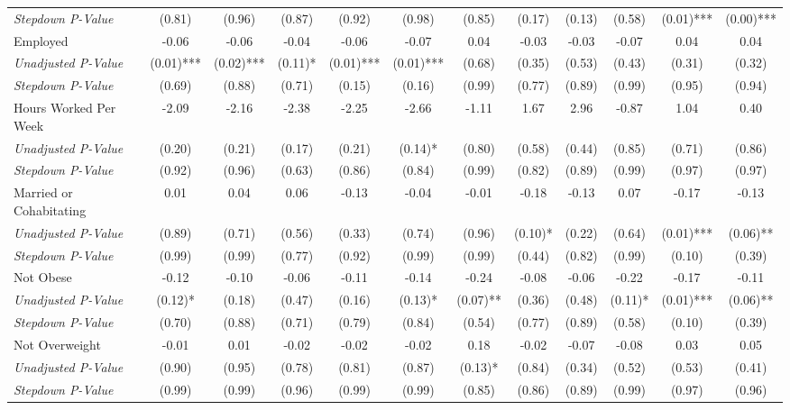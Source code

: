 \begin{tabular}{l c c c c c c c c c c c}
\quad \textit{Stepdown P-Value} & (0.81) & (0.96) & (0.87) & (0.92) & (0.98) & (0.85) & (0.17) & (0.13) & (0.58) & (0.01)*** & (0.00)*** \\
Employed & -0.06 & -0.06 & -0.04 & -0.06 & -0.07 & 0.04 & -0.03 & -0.03 & -0.07 & 0.04 & 0.04 \\
\quad \textit{Unadjusted P-Value} & (0.01)*** & (0.02)*** & (0.11)* & (0.01)*** & (0.01)*** & (0.68) & (0.35) & (0.53) & (0.43) & (0.31) & (0.32) \\
\quad \textit{Stepdown P-Value} & (0.69) & (0.88) & (0.71) & (0.15) & (0.16) & (0.99) & (0.77) & (0.89) & (0.99) & (0.95) & (0.94) \\
Hours Worked Per Week & -2.09 & -2.16 & -2.38 & -2.25 & -2.66 & -1.11 & 1.67 & 2.96 & -0.87 & 1.04 & 0.40 \\
\quad \textit{Unadjusted P-Value} & (0.20) & (0.21) & (0.17) & (0.21) & (0.14)* & (0.80) & (0.58) & (0.44) & (0.85) & (0.71) & (0.86) \\
\quad \textit{Stepdown P-Value} & (0.92) & (0.96) & (0.63) & (0.86) & (0.84) & (0.99) & (0.82) & (0.89) & (0.99) & (0.97) & (0.97) \\
Married or Cohabitating & 0.01 & 0.04 & 0.06 & -0.13 & -0.04 & -0.01 & -0.18 & -0.13 & 0.07 & -0.17 & -0.13 \\
\quad \textit{Unadjusted P-Value} & (0.89) & (0.71) & (0.56) & (0.33) & (0.74) & (0.96) & (0.10)* & (0.22) & (0.64) & (0.01)*** & (0.06)** \\
\quad \textit{Stepdown P-Value} & (0.99) & (0.99) & (0.77) & (0.92) & (0.99) & (0.99) & (0.44) & (0.82) & (0.99) & (0.10) & (0.39) \\
Not Obese & -0.12 & -0.10 & -0.06 & -0.11 & -0.14 & -0.24 & -0.08 & -0.06 & -0.22 & -0.17 & -0.11 \\
\quad \textit{Unadjusted P-Value} & (0.12)* & (0.18) & (0.47) & (0.16) & (0.13)* & (0.07)** & (0.36) & (0.48) & (0.11)* & (0.01)*** & (0.06)** \\
\quad \textit{Stepdown P-Value} & (0.70) & (0.88) & (0.71) & (0.79) & (0.84) & (0.54) & (0.77) & (0.89) & (0.58) & (0.10) & (0.39) \\
Not Overweight & -0.01 & 0.01 & -0.02 & -0.02 & -0.02 & 0.18 & -0.02 & -0.07 & -0.08 & 0.03 & 0.05 \\
\quad \textit{Unadjusted P-Value} & (0.90) & (0.95) & (0.78) & (0.81) & (0.87) & (0.13)* & (0.84) & (0.34) & (0.52) & (0.53) & (0.41) \\
\quad \textit{Stepdown P-Value} & (0.99) & (0.99) & (0.96) & (0.99) & (0.99) & (0.85) & (0.86) & (0.89) & (0.99) & (0.97) & (0.96) \\

\end{tabular}
